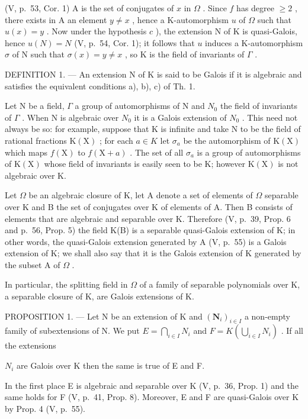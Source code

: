 (V, p.~53, Cor. 1) A is the set of conjugates of \(x\) in \(\Omega\) . Since \(f\) has degree \(\geqslant 2\) , there exists in A an element \(y \neq x\) , hence a K-automorphism \(u\) of \(\Omega\) such that \(u(x) = y\) . Now under the hypothesis \(c\) ), the extension N of K is quasi-Galois, hence \(u(N) = N\) (V, p.~54, Cor. 1); it follows that \(u\) induces a K-automorphism \(\sigma\) of N such that \(\sigma(x) = y \neq x\) , so K is the field of invariants of \(\Gamma\) .

DEFINITION 1. --- An extension N of K is said to be Galois if it is algebraic and satisfies the equivalent conditions a), b), c) of Th. 1.

Let N be a field, \(\Gamma\) a group of automorphisms of N and \(N_{0}\) the field of invariants of \(\Gamma\) . When N is algebraic over \(N_{0}\) it is a Galois extension of \(N_{0}\) . This need not always be so: for example, suppose that K is infinite and take N to be the field of rational fractions \(\mathrm{K}(\mathrm{X})\) ; for each \(a \in K\) let \(\sigma_{a}\) be the automorphism of \(\mathrm{K}(\mathrm{X})\) which maps \(f(\mathrm{X})\) to \(f(\mathrm{X} + a)\) . The set of all \(\sigma_{a}\) is a group of automorphisms of \(\mathrm{K}(\mathrm{X})\) whose field of invariants is easily seen to be K; however \(\mathrm{K}(\mathrm{X})\) is not algebraic over K.

Let \(\Omega\) be an algebraic closure of K, let A denote a set of elements of \(\Omega\) separable over K and B the set of conjugates over K of elements of A. Then B consists of elements that are algebraic and separable over K. Therefore (V, p.~39, Prop. 6 and p.~56, Prop. 5) the field K(B) is a separable quasi-Galois extension of K; in other words, the quasi-Galois extension generated by A (V, p.~55) is a Galois extension of K; we shall also say that it is the Galois extension of K generated by the subset A of \(\Omega\) .

In particular, the splitting field in \(\Omega\) of a family of separable polynomials over K, a separable closure of K, are Galois extensions of K.

PROPOSITION 1. --- Let N be an extension of K and \((\mathbf{N}_{i})_{i\in I}\) a non-empty family of subextensions of N. We put \(E=\bigcap_{i\in I}N_{i}\) and \(F=K\left(\bigcup_{i\in I}N_{i}\right)\) . If all the extensions

\(N_{i}\) are Galois over K then the same is true of E and F.

In the first place E is algebraic and separable over K (V, p.~36, Prop. 1) and the same holds for F (V, p.~41, Prop. 8). Moreover, E and F are quasi-Galois over K by Prop. 4 (V, p.~55).

